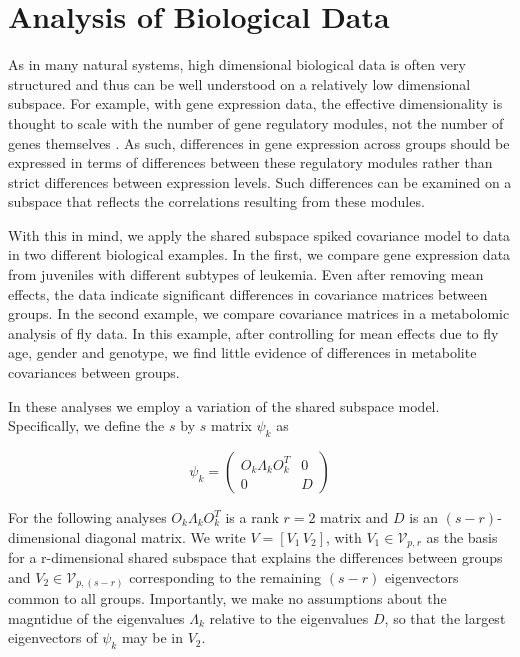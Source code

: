 \documentclass{article}
\begin{document}
\section{Analysis of Biological Data}
\label{sec:bio}
As in many natural systems, high dimensional biological data is often
very structured and thus can be well understood on a relatively low
dimensional subspace. For example, with gene expression
data, the effective dimensionality is thought to scale with the number
of gene regulatory modules, not the number of genes themselves
\citep{Heimberg2016}.  As such, differences in gene expression across
groups should be expressed in terms of differences between these
regulatory modules rather than strict differences between expression
levels.  Such differences can be examined on a subspace that reflects
the correlations resulting from these modules.

With this in mind, we apply the shared subspace spiked covariance model to data in two
different biological examples.  In the first, we compare gene
expression data from juveniles with different subtypes of leukemia.  Even
after removing mean effects, the data indicate significant differences
in covariance matrices between groups.  In the second example, we
compare covariance matrices in a metabolomic analysis of fly data.  In
this example, after controlling for mean effects due to fly age, gender and
genotype, we find little evidence of differences in metabolite
covariances between groups. 

In these analyses we employ a variation of the shared
subspace model.  Specifically, we define the $s$ by $s$ matrix $\psi_k$ as

\begin{equation}
\psi_k =\left( \begin{array}{cc}
O_k\Lambda_kO_k^T & 0  \\
0 & D  \end{array} \right)
\end{equation}

For the following analyses $O_k\Lambda_kO_k^T$ is a rank $r=2$ matrix
and $D$ is an $(s-r)$-dimensional diagonal matrix.  We write
$V = [V_1\, V_2]$, with $V_1 \in \mathcal{V}_{p,r}$ as the basis for a
r-dimensional shared subspace that explains the differences between
groups and $V_2 \in \mathcal{V}_{p,(s-r)}$ corresponding to the remaining $(s-r)$
eigenvectors common to all groups.  Importantly, we make no assumptions about the
magntidue of the eigenvalues $\Lambda_k$ relative to the eigenvalues
$D$, so that the largest eigenvectors of $\psi_k$ may be in $V_2$.  
\end{document}
